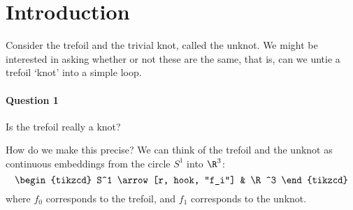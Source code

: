 \documentclass{article}
\numberwithin{nthm}{subsection}
\begin{document}
\maketitle

\tableofcontents

\clearpage
\section{Introduction}
Consider the trefoil and the trivial knot, called the unknot. We might be interested in asking whether or not these are the same, that is, can we untie a trefoil `knot' into a simple loop.

\begin{center}
\end{center}
\paragraph{Question 1} Is the trefoil really a knot?

How do we make this precise?
We can think of the trefoil and the unknot as continuous embeddings from the circle $S^1$ into $\R^3$:
\begin{equation*}
    \begin{tikzcd}
        S^1 \arrow[r, hook, "f_i"] & \R^3
    \end{tikzcd}
\end{equation*}
where $f_0$ corresponds to the trefoil, and $f_1$ corresponds to the unknot.
\end{document}
